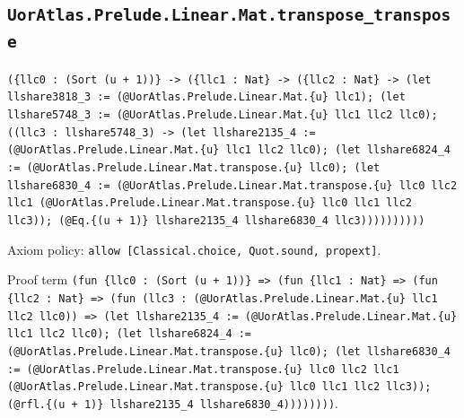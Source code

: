 \documentclass[11pt]{article}
\begin{document}
\subsection*{\texttt{UorAtlas.Prelude.Linear.Mat.transpose\_transpose}}
\noindent\texttt{(\{llc0 : (Sort (u + 1))\} -> (\{llc1 : Nat\} -> (\{llc2 : Nat\} -> (let llshare3818\_3 := (@UorAtlas.Prelude.Linear.Mat.\{u\} llc1); (let llshare5748\_3 := (@UorAtlas.Prelude.Linear.Mat.\{u\} llc1 llc2 llc0); ((llc3 : llshare5748\_3) -> (let llshare2135\_4 := (@UorAtlas.Prelude.Linear.Mat.\{u\} llc1 llc2 llc0); (let llshare6824\_4 := (@UorAtlas.Prelude.Linear.Mat.transpose.\{u\} llc0); (let llshare6830\_4 := (@UorAtlas.Prelude.Linear.Mat.transpose.\{u\} llc0 llc2 llc1 (@UorAtlas.Prelude.Linear.Mat.transpose.\{u\} llc0 llc1 llc2 llc3)); (@Eq.\{(u + 1)\} llshare2135\_4 llshare6830\_4 llc3))))))))))}\par
\noindent Axiom policy: \texttt{allow [Classical.choice, Quot.sound, propext]}.\par
\noindent Proof term \texttt{(fun \{llc0 : (Sort (u + 1))\} => (fun \{llc1 : Nat\} => (fun \{llc2 : Nat\} => (fun (llc3 : (@UorAtlas.Prelude.Linear.Mat.\{u\} llc1 llc2 llc0)) => (let llshare2135\_4 := (@UorAtlas.Prelude.Linear.Mat.\{u\} llc1 llc2 llc0); (let llshare6824\_4 := (@UorAtlas.Prelude.Linear.Mat.transpose.\{u\} llc0); (let llshare6830\_4 := (@UorAtlas.Prelude.Linear.Mat.transpose.\{u\} llc0 llc2 llc1 (@UorAtlas.Prelude.Linear.Mat.transpose.\{u\} llc0 llc1 llc2 llc3)); (@rfl.\{(u + 1)\} llshare2135\_4 llshare6830\_4))))))))}.\par
\end{document}
